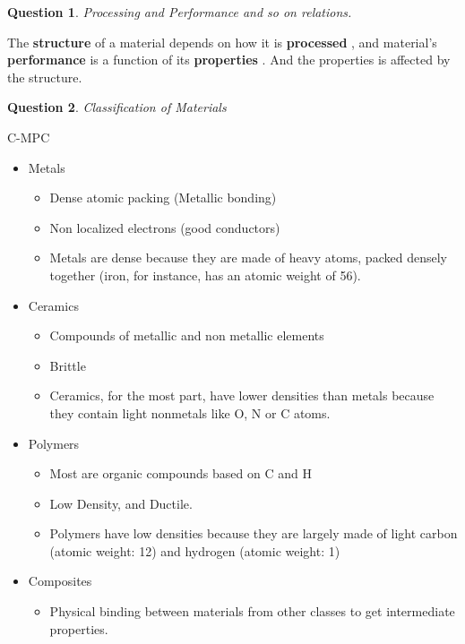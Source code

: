 \documentclass[13]{article}
\newtheorem{exer}{Question}
\begin{document}
\begin{exer}
Processing and Performance and so on relations.
\end{exer}
The \textbf{structure}  of a material depends on how it is \textbf{processed} , and material's \textbf{performance} is a function of its \textbf{properties} . And the properties is affected by the structure. 
\begin{exer}
Classification of Materials
\end{exer}
C-MPC
\begin{itemize}

\item Metals
\begin{itemize}

	\item Dense atomic packing (Metallic bonding)
	\item Non localized electrons (good conductors)
	\item Metals are dense because they are made of heavy atoms, packed 
densely together (iron, for instance, has an atomic weight of 56).
\end{itemize}
\item Ceramics
\begin{itemize}

\item Compounds of metallic and non metallic elements
\item Brittle
\item Ceramics, for the most part, have lower densities than metals because
	they contain light nonmetals like O, N or C atoms.
\end{itemize}
\item Polymers
	\begin{itemize}
	
	\item Most are organic compounds based on C and H
	\item Low Density, and Ductile.
	\item Polymers have low densities because they are largely made of
		light carbon (atomic weight: 12) and hydrogen (atomic weight:
		1) 	
	\end{itemize}
\item Composites
\begin{itemize}

\item Physical binding between materials from other classes to get intermediate properties.

\end{itemize}
\end{itemize}
\end{document}
